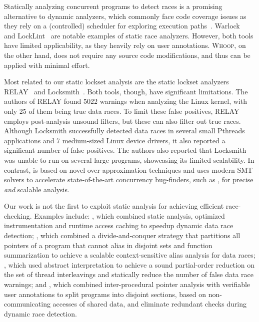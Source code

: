 Statically analyzing concurrent programs to detect races is a promising alternative to dynamic analyzers, which commonly face code coverage issues as they rely on a (controlled) scheduler for exploring execution paths~\cite{musuvathi2008finding}. Warlock~\cite{sterling1993warlock} and LockLint~\cite{oracle2010locklint} are notable examples of static race analyzers. However, both tools have limited applicability, as they heavily rely on user annotations. \textsc{Whoop}, on the other hand, does not require any source code modifications, and thus can be applied with minimal effort.

Most related to our static lockset analysis are the static lockset analyzers RELAY~\cite{voung2007relay} and Locksmith~\cite{pratikakis2006locksmith}. Both tools, though, have significant limitations. The authors of RELAY found 5022 warnings when analyzing the Linux kernel, with only 25 of them being true data races. To limit these false positives, RELAY employs post-analysis unsound filters, but these can also filter out true races. Although Locksmith successfully detected data races in several small Pthreads applications and 7 medium-sized Linux device drivers, it also reported a significant number of false positives. The authors also reported that Locksmith was unable to run on several large programs, showcasing its limited scalability. In contrast, \whoop is based on novel over-approximation techniques and uses modern SMT solvers to accelerate state-of-the-art concurrency bug-finders, such as \corral, for precise \emph{and} scalable analysis.

Our work is not the first to exploit static analysis for achieving efficient race-checking. Examples include: \cite{choi2002efficient}, which combined static analysis, optimized instrumentation and runtime access caching to speedup dynamic data race detection; \cite{kahlon2007fast}, which combined a divide-and-conquer strategy that partitions all pointers of a program that cannot alias in disjoint sets and function summarization to achieve a scalable context-sensitive alias analysis for data races; \cite{kahlon2009semantic}, which used abstract interpretation to achieve a sound partial-order reduction on the set of thread interleavings and statically reduce the number of false data race warnings; and \cite{das2015section}, which combined inter-procedural pointer analysis with verifiable user annotations to split programs into disjoint sections, based on non-communicating accesses of shared data, and eliminate redundant checks during dynamic race detection.